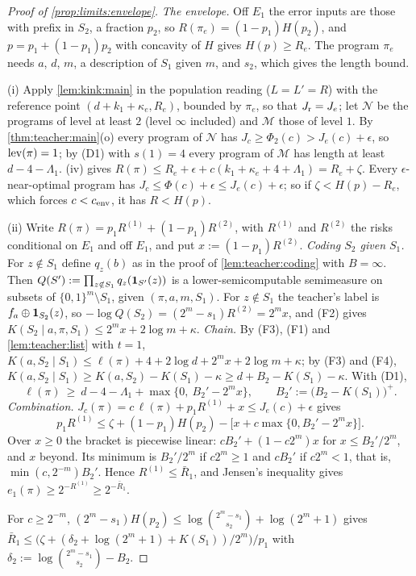 \begin{proof}[Proof of \cref{prop:limits:envelope}]
\emph{The envelope.} Off $E_1$ the error inputs are those with prefix in $S_2$, a fraction $p_2$, so $R(\pi_e)=(1-p_1)H(p_2)$, and $p=p_1+(1-p_1)p_2$ with concavity of $H$ gives $H(p)\ge R_e$. The program $\pi_e$ needs $a$, $d$, $m$, a description of $S_1$ given $m$, and $s_2$, which gives the length bound.

(i) Apply \cref{lem:kink:main} in the population reading ($L=L'=R$) with the reference point $(d+k_1+\kappa_e,R_e)$, bounded by $\pi_e$, so that $J_{\rm r}=J_e$; let $\mathcal N$ be the programs of level at least $2$ (level $\infty$ included) and $\mathcal M$ those of level $1$. By \cref{thm:teacher:main}(o) every program of $\mathcal N$ has $J_c\ge\Phi_2(c)>J_e(c)+\epsilon$, so $\operatorname{lev}(\pi)=1$; by (D1) with $s(1)=4$ every program of $\mathcal M$ has length at least $d-4-\Lambda_1$. (iv) gives $R(\pi)\le R_e+\epsilon+c(k_1+\kappa_e+4+\Lambda_1)=R_e+\zeta$. Every $\epsilon$-near-optimal program has $J_c\le\Phi(c)+\epsilon\le J_e(c)+\epsilon$; so if $\zeta<H(p)-R_e$, which forces $c<c_{\rm env}$, it has $R<H(p)$.

(ii) Write $R(\pi)=p_1R^{(1)}+(1-p_1)R^{(2)}$, with $R^{(1)}$ and $R^{(2)}$ the risks conditional on $E_1$ and off $E_1$, and put $x:=(1-p_1)R^{(2)}$. \emph{Coding $S_2$ given $S_1$.} For $z\notin S_1$ define $q_z(b)$ as in the proof of \cref{lem:teacher:coding} with $B=\infty$. Then $Q(S'):=\prod_{z\notin S_1}q_z(\mathbf{1}_{S'}(z))$ is a lower-semicomputable semimeasure on subsets of $\{0,1\}^m\setminus S_1$, given $(\pi,a,m,S_1)$. For $z\notin S_1$ the teacher's label is $f_a\oplus\mathbf{1}_{S_2}(z)$, so $-\log Q(S_2)=(2^m-s_1)R^{(2)}=2^mx$, and (F2) gives $K(S_2\mid a,\pi,S_1)\le2^mx+2\log m+\kappa$. \emph{Chain.} By (F3), (F1) and \cref{lem:teacher:list} with $t=1$, $K(a,S_2\mid S_1)\le\ell(\pi)+4+2\log d+2^mx+2\log m+\kappa$; by (F3) and (F4), $K(a,S_2\mid S_1)\ge K(a,S_2)-K(S_1)-\kappa\ge d+B_2-K(S_1)-\kappa$. With (D1),
\[
\ell(\pi)\ \ge\ d-4-\Lambda_1+\max\big\{0,\ B_2'-2^mx\big\},\qquad B_2':=\big(B_2-K(S_1)\big)^+ .
\]
\emph{Combination.} $J_c(\pi)=c\,\ell(\pi)+p_1R^{(1)}+x\le J_e(c)+\epsilon$ gives
\[
p_1R^{(1)}\le\zeta+(1-p_1)H(p_2)-\big[x+c\max\{0,B_2'-2^mx\}\big].
\]
Over $x\ge0$ the bracket is piecewise linear: $cB_2'+(1-c2^m)x$ for $x\le B_2'/2^m$, and $x$ beyond. Its minimum is $B_2'/2^m$ if $c2^m\ge1$ and $cB_2'$ if $c2^m<1$, that is, $\min(c,2^{-m})B_2'$. Hence $R^{(1)}\le\bar R_1$, and Jensen's inequality gives $e_1(\pi)\ge2^{-R^{(1)}}\ge2^{-\bar R_1}$.

For $c\ge2^{-m}$, $(2^m-s_1)H(p_2)\le\log\binom{2^m-s_1}{s_2}+\log(2^m+1)$ gives $\bar R_1\le\big(\zeta+(\delta_2+\log(2^m+1)+K(S_1))/2^m\big)/p_1$ with $\delta_2:=\log\binom{2^m-s_1}{s_2}-B_2$.
\end{proof}

